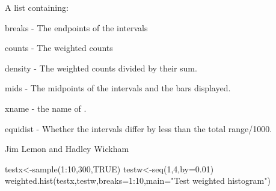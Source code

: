 \begin{Value}
A list containing:

breaks - The endpoints of the intervals

counts - The weighted counts

density - The weighted counts divided by their sum.

mids - The midpoints of the intervals and the bars displayed.

xname - the name of .

equidist - Whether the intervals differ by less than the total range/1000.
\end{Value}
\begin{Author}\relax
Jim Lemon and Hadley Wickham
\end{Author}
\begin{SeeAlso}\relax
{}
\end{SeeAlso}
\begin{Examples}
\begin{ExampleCode}
 testx<-sample(1:10,300,TRUE)
 testw<-seq(1,4,by=0.01)
 weighted.hist(testx,testw,breaks=1:10,main="Test weighted histogram")
\end{ExampleCode}
\end{Examples}

